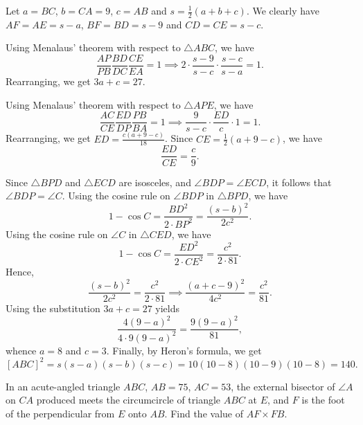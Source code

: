 Let $a = BC$, $b = CA = 9$, $c = AB$ and $s = \frac12 (a + b + c)$. We clearly have $AF = AE = s-a$, $BF = BD = s-9$ and $CD = CE = s-c$.

Using Menalaus' theorem with respect to $\triangle ABC$, we have \[\frac{AP}{PB} \frac{BD}{DC} \frac{CE}{EA} = 1 \implies 2 \cdot \frac{s-9}{s-c} \cdot \frac{s-c}{s-a} = 1.\] Rearranging, we get $3a + c = 27$.

Using Menalaus' theorem with respect to $\triangle APE$, we have \[\frac{AC}{CE} \frac{ED}{DP} \frac{PB}{BA} = 1 \implies \frac{9}{s-c}\cdot \frac{ED}{c} \cdot 1 = 1.\] Rearranging, we get $ED = \frac{c(a + 9 - c)}{18}$. Since $CE = \frac12 (a + 9 - c)$, we have \[\frac{ED}{CE} = \frac{c}{9}.\]

Since $\triangle BPD$ and $\triangle ECD$ are isosceles, and $\angle BDP = \angle ECD$, it follows that $\angle BDP = \angle C$. Using the cosine rule on $\angle BDP$ in $\triangle BPD$, we have \[1 - \cos C = \frac{BD^2}{2 \cdot BP^2} = \frac{(s-b)^2}{2c^2}.\] Using the cosine rule on $\angle C$ in $\triangle CED$, we have \[1 - \cos C = \frac{ED^2}{2 \cdot CE^2} = \frac{c^2}{2 \cdot 81}.\] Hence, \[\frac{(s-b)^2}{2c^2} = \frac{c^2}{2 \cdot 81} \implies \frac{(a + c - 9)^2}{4c^2} = \frac{c^2}{81}.\] Using the substitution $3a + c = 27$ yields \[\frac{4(9-a)^2}{4 \cdot 9(9-a)^2} = \frac{9(9-a)^2}{81},\] whence $a = 8$ and $c = 3$. Finally, by Heron's formula, we get \[[ABC]^2 = s(s-a)(s-b)(s-c) = 10(10-8)(10-9)(10-8) = 140.\]

\begin{question}[704]\label{A::2020-O-1-21}
    In an acute-angled triangle $ABC$, $AB = 75$, $AC = 53$, the external bisector of $\angle A$ on $CA$ produced meets the circumcircle of triangle $ABC$ at $E$, and $F$ is the foot of the perpendicular from $E$ onto $AB$. Find the value of $AF \times FB$.
\end{question}

